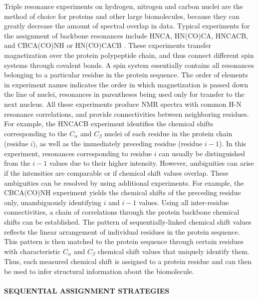 \documentclass{article}
\begin{document}
\indent Triple resonance experiments on hydrogen, nitrogen and carbon nuclei are the method of choice for proteins and other large biomolecules, because they can greatly decrease the amount of spectral overlap in data. Typical experiments for the assignment of backbone resonances include HNCA, HN(CO)CA, HNCACB, and CBCA(CO)NH or HN(CO)CACB \cite{cavanagh}. These experiments transfer magnetization over the protein polypeptide chain, and thus connect different spin systems through covalent bonds. A spin system essentially contains all resonances belonging to a particular residue in the protein sequence. The order of elements in experiment names indicates the order in which magnetization is passed down the line of nuclei, resonances in parentheses being used only for transfer to the next nucleus. All these experiments produce NMR spectra with common H-N resonance correlations, and provide connectivities between neighboring residues. For example, the HNCACB experiment identifies the chemical shifts corresponding to the $C_{\alpha}$ and $C_{\beta}$ nuclei of each residue in the protein chain (residue $i$), as well as the immediately preceding residue (residue $i-1$). In this experiment, resonances corresponding to residue $i$ can usually be distinguished from the $i-1$ values due to their higher intensity. However, ambiguities can arise if the intensities are comparable or if chemical shift values overlap. These ambiguities can be resolved by using additional experiments. For example, the CBCA(CO)NH experiment yields the chemical shifts of the preceding residue only, unambiguously identifying $i$ and $i-1$ values. Using all inter-residue connectivities, a chain of correlations through the protein backbone chemical shifts can be established. The pattern of sequentially-linked chemical shift values reflects the linear arrangement of individual residues in the protein sequence. This pattern is then matched to the protein sequence through certain residues with characteristic $C_{\alpha}$ and $C_{\beta}$ chemical shift values that uniquely identify them. Thus, each measured chemical shift is assigned to a protein residue and can then be used to infer structural information about the biomolecule.
\\\\
\noindent \textbf{SEQUENTIAL ASSIGNMENT STRATEGIES}\\
\end{document}
